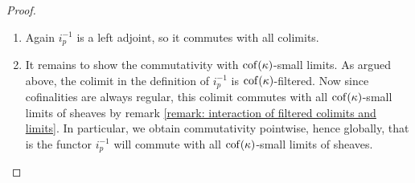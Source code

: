 \begin{proof}
\begin{enumerate}
		\item
		Again $i_p^{-1}$ is a left adjoint, so it commutes with all colimits.
		
		\item
		It remains to show the commutativity with ${\operatorname{cof}(\kappa)}$-small limits. As argued above, the colimit in the definition of $i_p^{-1}$ is ${\operatorname{cof}(\kappa)}$-filtered. Now since cofinalities are always regular, this colimit commutes with all ${\operatorname{cof}(\kappa)}$-small limits of sheaves by remark \ref{remark: interaction of filtered colimits and limits}. In particular, we obtain commutativity pointwise, hence globally, that is the functor $i_p^{-1}$ will commute with all ${\operatorname{cof}(\kappa)}$-small limits of sheaves.
	\end{enumerate}
\end{proof}

